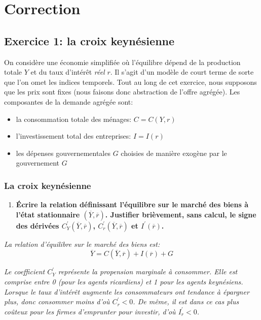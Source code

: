 \documentclass[
]{article}
\author{}
\date{}
\providecommand{\tightlist}{%
  \setlength{\itemsep}{0pt}\setlength{\parskip}{0pt}}
\begin{document}
\hypertarget{correction}{%
\section{Correction}\label{correction}}

\hypertarget{exercice-1-la-croix-keynuxe9sienne}{%
\subsection{Exercice 1: la croix
keynésienne}\label{exercice-1-la-croix-keynuxe9sienne}}

On considère une économie simplifiée où l'équilibre dépend de la
production totale \(Y\) et du taux d'intérêt \emph{réel} \(r\). Il
s'agit d'un modèle de court terme de sorte que l'on omet les indices
temporels. Tout au long de cet exercice, nous supposons que les prix
sont fixes (nous faisons donc abstraction de l'offre agrégée). Les
composantes de la demande agrégée sont:

\begin{itemize}
\tightlist
\item
  la consommation totale des ménages: \(C=C(Y,r)\)
\item
  l'investissement total des entreprises: \(I=I(r)\)
\item
  les dépenses gouvernementales \(G\) choisies de manière exogène par le
  gouvernement \(G\)
\end{itemize}

\hypertarget{la-croix-keynuxe9sienne}{%
\subsubsection{La croix keynésienne}\label{la-croix-keynuxe9sienne}}

\begin{enumerate}
\def\labelenumi{\arabic{enumi}.}
\tightlist
\item
  \textbf{Écrire la relation définissant l'équilibre sur le marché des
  biens à l'état stationnaire \((\overline{Y},\overline{r})\). Justifier
  brièvement, sans calcul, le signe des dérivées
  \(C^{\prime}_Y(\overline{Y},\overline{r})\),
  \(C^{\prime}_r(\overline{Y},\overline{r})\) et
  \(I^{\prime}(\overline{r})\).}
\end{enumerate}

\emph{La relation d'équilibre sur le marché des biens est:
\[\overline{Y} = C(\overline{Y}, \overline{r}) + I(\overline{r})  + G\]}

\emph{Le coefficient \(C_Y^{\prime}\) représente la propension marginale
à consommer. Elle est comprise entre 0 (pour les agents ricardiens) et 1
pour les agents keynésiens. Lorsque le taux d'intérêt augmente les
consommateurs ont tendance à épargner plus, donc consommer moins d'où
\(C^{\prime}_r<0\). De même, il est dans ce cas plus coûteux pour les
firmes d'emprunter pour investir, d'où \(I^{\prime}_r<0\).}
\end{document}
